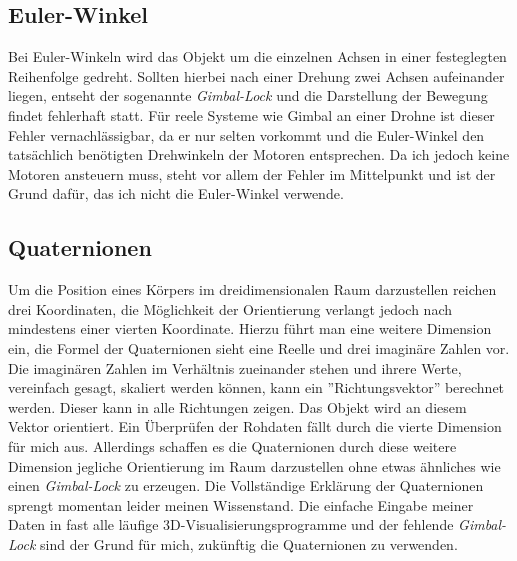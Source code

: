 \subsection{Euler-Winkel}
Bei Euler-Winkeln wird das Objekt um die einzelnen Achsen in einer festeglegten Reihenfolge gedreht. Sollten hierbei 
nach einer Drehung zwei Achsen aufeinander liegen, entseht der sogenannte \textit{Gimbal-Lock} und die Darstellung
der Bewegung findet fehlerhaft statt. Für reele Systeme wie Gimbal an einer Drohne ist dieser Fehler vernachlässigbar,
da er nur selten vorkommt und die Euler-Winkel den tatsächlich benötigten Drehwinkeln der Motoren entsprechen.
Da ich jedoch keine Motoren ansteuern muss, steht vor allem der Fehler im Mittelpunkt und ist der Grund dafür, das ich nicht
die Euler-Winkel verwende.  

\subsection{Quaternionen}
Um die Position eines Körpers im dreidimensionalen Raum darzustellen reichen drei Koordinaten, 
die Möglichkeit der Orientierung verlangt jedoch nach mindestens einer vierten Koordinate. 
Hierzu führt man eine weitere Dimension ein, die Formel der Quaternionen sieht eine Reelle und drei imaginäre Zahlen vor.
Die imaginären Zahlen im Verhältnis zueinander stehen und ihrere Werte, vereinfach gesagt, skaliert werden können, kann 
ein ''Richtungsvektor'' berechnet werden. Dieser kann in alle Richtungen zeigen. Das Objekt wird an diesem Vektor orientiert.
Ein Überprüfen der Rohdaten fällt durch die vierte Dimension für mich aus.
Allerdings schaffen es die Quaternionen durch diese weitere Dimension jegliche Orientierung im Raum darzustellen ohne
etwas ähnliches wie einen \textit{Gimbal-Lock} zu erzeugen. Die Vollständige Erklärung der Quaternionen sprengt momentan
leider meinen Wissenstand. Die einfache Eingabe meiner Daten in fast alle läufige 3D-Visualisierungsprogramme und 
der fehlende \textit{Gimbal-Lock} sind der Grund für mich, zukünftig die Quaternionen zu verwenden.
